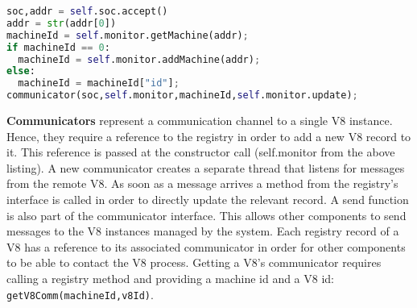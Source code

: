 \documentclass{l4proj}
\begin{document}
\begin{lstlisting}[language=python]
soc,addr = self.soc.accept()
addr = str(addr[0])
machineId = self.monitor.getMachine(addr);
if machineId == 0:
  machineId = self.monitor.addMachine(addr); 
else:
  machineId = machineId["id"];
communicator(soc,self.monitor,machineId,self.monitor.update);
\end{lstlisting}
\hspace*{3em} \textbf{Communicators} represent a communication channel to a single V8 instance. Hence, they require a reference to the registry in order to add a new V8 record to it. This reference is passed at the constructor call (self.monitor from the above listing). A new communicator creates a separate thread that listens for messages from the remote V8. As soon as a message arrives a method from the registry's interface is called in order to directly update the relevant record. A send function is also part of the communicator interface. This allows other components to send messages to the V8 instances managed by the system. Each registry record of a V8 has a reference to its associated communicator in order for other components to be able to contact the V8 process. Getting a V8's communicator requires calling a registry method and providing a machine id and a V8 id: \texttt{getV8Comm(machineId,v8Id)}.
\end{document}
